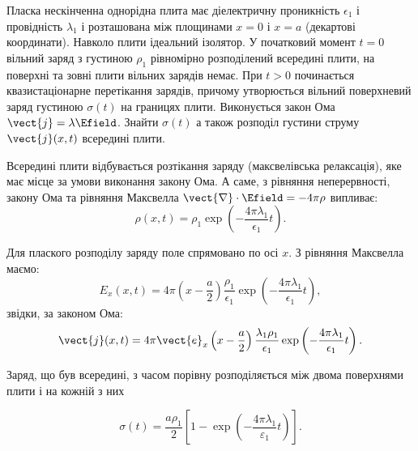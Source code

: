 \begin{problem}\label{prb:MaxwellRelax}
Пласка нескінченна однорідна плита має діелектричну проникність $\epsilon_1$  і провідність $\lambda_1$ і розташована між площинами $x = 0$  і $x = a$ (декартові координати). Навколо плити ідеальний ізолятор. У початковий момент $t= 0$  вільний заряд з густиною $\rho_1$  рівномірно розподілений всередині плити, на поверхні та зовні плити вільних зарядів немає. При  $t > 0 $ починається квазистаціонарне перетікання зарядів, причому утворюється вільний поверхневий заряд густиною $\sigma(t)$  на границях плити. Виконується закон Ома  $\vect{j} = \lambda\Efield$. Знайти  $\sigma(t)$  а також розподіл густини струму $\vect{j}(x,t)$ всередині плити.
\begin{solution}
	Всередині плити відбувається розтікання заряду (максвелівська релаксація), яке має місце за умови виконання закону Ома. А саме, з рівняння неперервності, закону Ома та рівняння Максвелла $\vect{\nabla}\cdot\Efield = -4\pi\rho$   випливає:
	\[
		\rho (x,t) = \rho_1\exp \left(  - \frac{4\pi \lambda _1}{\epsilon _1}t \right).
	\]

	Для плаского розподілу заряду поле спрямовано по осі $x$. З рівняння Максвелла маємо:
	\[
		E_x(x,t) = 4\pi \left( {x - \frac{a}{2}} \right)\frac{{{\rho_1}}}{{{\epsilon _1}}}\exp \left( { - \frac{{4\pi {\lambda _1}}}{{{\epsilon_1}}}t} \right),
	\]
	звідки, за законом Ома:
	\[
		\vect{j}(x,t) = 4\pi \vect{e}_x\left( x - \frac{a}{2} \right)\frac{\lambda _1\rho _1}{\epsilon _1}\exp \left( - \frac{4\pi\lambda_1}{\epsilon_1}t \right).
	\]

	Заряд, що був всередині, з часом порівну розподіляється між двома поверхнями плити і на кожній з них

	\[
		\sigma (t) = \frac{a\rho_1}{2}\left[ {1 - \exp \left( { - \frac{{4\pi {\lambda _1}}}{{{\varepsilon _1}}}t} \right)} \right].
	\]
\end{solution}
\end{problem}

